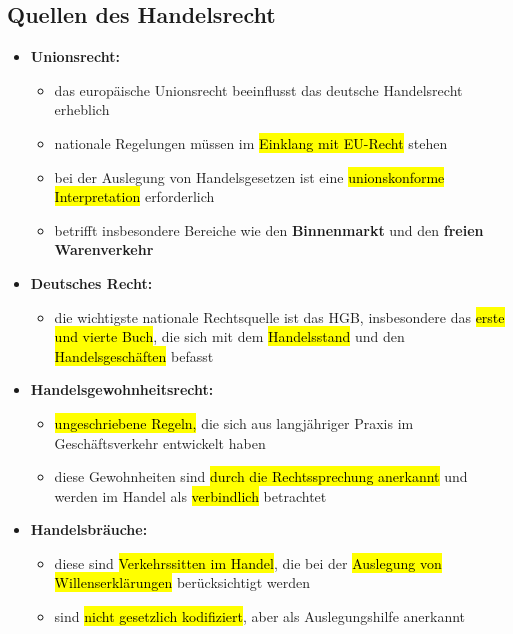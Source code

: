 \documentclass[a4paper, 10pt]{article}
\begin{document}
\subsection{Quellen des Handelsrecht}
\begin{itemize}
    \item \textbf{Unionsrecht:}
    \begin{itemize}
        \item das europäische Unionsrecht beeinflusst das deutsche Handelsrecht erheblich
        \item nationale Regelungen müssen im \hl{Einklang mit EU-Recht} stehen
        \item bei der Auslegung von Handelsgesetzen ist eine \hl{unionskonforme Interpretation} erforderlich
        \item betrifft insbesondere Bereiche wie den \textbf{Binnenmarkt} und den \textbf{freien Warenverkehr}
    \end{itemize}
   
    \item \textbf{Deutsches Recht:}
    \begin{itemize}
        \item die wichtigste nationale Rechtsquelle ist das HGB, insbesondere das \hl{erste und vierte Buch}, die sich mit dem \hl{Handelsstand} und den \hl{Handelsgeschäften} befasst
    \end{itemize}

    \item \textbf{Handelsgewohnheitsrecht:}
    \begin{itemize}
        \item \hl{ungeschriebene Regeln,} die sich aus langjähriger Praxis im Geschäftsverkehr entwickelt haben
        \item diese Gewohnheiten sind \hl{durch die Rechtssprechung anerkannt} und werden im Handel als \hl{verbindlich} betrachtet
    \end{itemize}


    \item \textbf{Handelsbräuche:}
    \begin{itemize}
        \item diese sind \hl{Verkehrssitten im Handel}, die bei der \hl{Auslegung von Willenserklärungen} berücksichtigt werden
        \item sind \hl{nicht gesetzlich kodifiziert}, aber als Auslegungshilfe anerkannt 
    \end{itemize}
\end{itemize}
\end{document}
